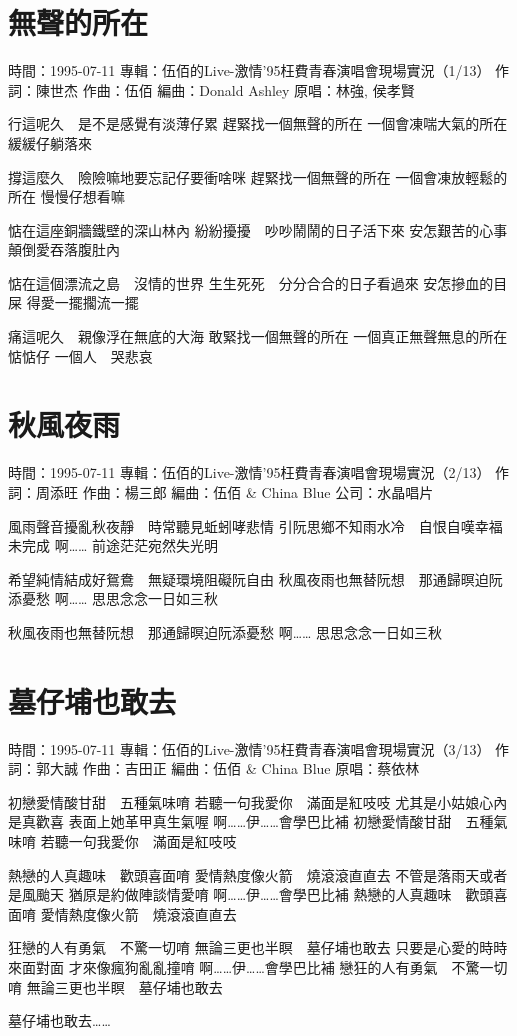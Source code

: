 \documentclass[UTF8,a4paper,oneside,twocolumn,12pt]{ctexbook}
\newcommand{\infopair}[2]{\textbullet #1：#2}
\newcommand{\zc}[1][伍佰]{\infopair{作詞}{#1}}
\newcommand{\zq}[1][伍佰]{\infopair{作曲}{#1}}
\newcommand{\bq}[1][伍佰]{\infopair{編曲}{#1}}
\newcommand{\zj}[1]{\infopair{專輯}{#1}}
\newcommand{\yc}[1]{\infopair{原唱}{#1}}
\newcommand{\sj}[1]{\infopair{時間}{#1}}
\newenvironment{info}{\begin{flushleft}\kaishu
	}
	{\end{flushleft}\normalsize\yahei\par}
\newenvironment{lyric}{
	}
{}
\begin{document}
\section{無聲的所在}
\begin{info}
	\sj{1995-07-11}
	\zj{伍佰的Live-激情'95枉費青春演唱會現場實況（1/13）}
	\zc[陳世杰]
	\zq
	\bq[Donald Ashley]
	\yc{林強, 侯孝賢}
\end{info}
\begin{lyric}
	行這呢久　是不是感覺有淡薄仔累
	趕緊找一個無聲的所在
	一個會凍喘大氣的所在
	緩緩仔躺落來

	撐這麼久　險險嘛地要忘記仔要衝啥咪
	趕緊找一個無聲的所在
	一個會凍放輕鬆的所在
	慢慢仔想看嘛

	惦在這座銅牆鐵壁的深山林內
	紛紛擾擾　吵吵鬧鬧的日子活下來
	安怎艱苦的心事　顛倒愛吞落腹肚內

	惦在這個漂流之島　沒情的世界
	生生死死　分分合合的日子看過來
	安怎摻血的目屎
	得愛一擺擱流一擺

	痛這呢久　親像浮在無底的大海
	敢緊找一個無聲的所在
	一個真正無聲無息的所在
	惦惦仔  一個人　哭悲哀
\end{lyric}

\section{秋風夜雨}
\begin{info}
	\sj{1995-07-11}
	\zj{伍佰的Live-激情'95枉費青春演唱會現場實況（2/13）}
	\zc[周添旺]
	\zq[楊三郎]
	\bq[伍佰 \& China Blue]
	\infopair{公司}{水晶唱片}
\end{info}
\begin{lyric}
	風雨聲音擾亂秋夜靜　時常聽見蚯蚓哮悲情
	引阮思鄉不知雨水冷　自恨自嘆幸福未完成
	啊……  前途茫茫宛然失光明

	希望純情結成好鴛鴦　無疑環境阻礙阮自由
	秋風夜雨也無替阮想　那通歸暝迫阮添憂愁
	啊……  思思念念一日如三秋

	秋風夜雨也無替阮想　那通歸暝迫阮添憂愁
	啊……  思思念念一日如三秋
\end{lyric}

\section{墓仔埔也敢去}
\begin{info}
	\sj{1995-07-11}
	\zj{伍佰的Live-激情'95枉費青春演唱會現場實況（3/13）}
	\zc[郭大誠]
	\zq[吉田正]
	\bq[伍佰 \& China Blue]
	\yc{蔡依林}
\end{info}
\begin{lyric}
	初戀愛情酸甘甜　五種氣味唷
	若聽一句我愛你　滿面是紅吱吱
	尤其是小姑娘心內是真歡喜
	表面上她革甲真生氣喔
	啊……伊……會學巴比補
	初戀愛情酸甘甜　五種氣味唷
	若聽一句我愛你　滿面是紅吱吱

	熱戀的人真趣味　歡頭喜面唷
	愛情熱度像火箭　燒滾滾直直去
	不管是落雨天或者是風颱天
	猶原是約做陣談情愛唷
	啊……伊……會學巴比補
	熱戀的人真趣味　歡頭喜面唷
	愛情熱度像火箭　燒滾滾直直去

	狂戀的人有勇氣　不驚一切唷
	無論三更也半瞑　墓仔埔也敢去
	只要是心愛的時時來面對面
	才來像瘋狗亂亂撞唷
	啊……伊……會學巴比補
	戀狂的人有勇氣　不驚一切唷
	無論三更也半瞑　墓仔埔也敢去

	墓仔埔也敢去……
\end{lyric}
\end{document}
